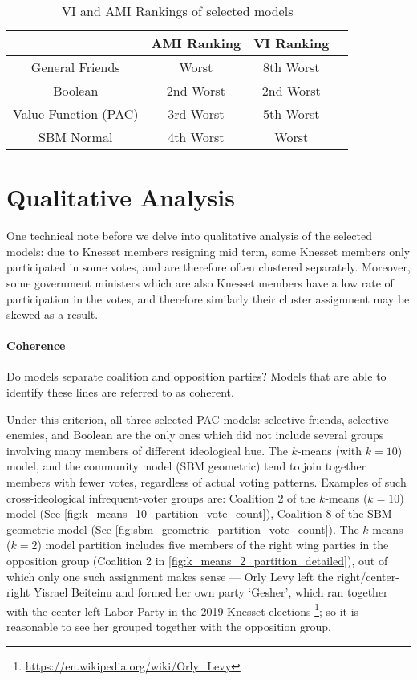 \begin{table}[ht]
\centering
\begin{tabular}{|c|c|c|c|}
\hline
       & AMI Ranking & VI Ranking \\ \hline
General Friends & Worst & 8th Worst \\
Boolean & 2nd Worst & 2nd Worst \\
Value Function (PAC) & 3rd Worst & 5th Worst \\
SBM Normal & 4th Worst & Worst \\
\hline
\end{tabular}
\caption{VI and AMI Rankings of selected models}
\label{Analysis:table:ami_vi_worst_rankings}
\end{table}


\section{Qualitative Analysis}
\label{sec:qualitative_analysis}

One technical note before we delve into qualitative analysis of the selected
models: due to Knesset members resigning mid term, some Knesset members only participated in some votes, and are therefore often clustered separately.
Moreover, some government ministers which are also Knesset members have a low
rate of participation in the votes, and therefore similarly their cluster
assignment may be skewed as a result.

\paragraph{Coherence}
Do models separate coalition and opposition parties? Models that are able to identify these lines are referred to as coherent.

Under this criterion, all three selected PAC models: selective friends,
selective enemies, and Boolean are the only ones which did not include several
groups involving many members of different ideological hue.
The $k$-means (with $k=10$) model, and the community model (SBM geometric) tend to
join together members with fewer votes, regardless of actual voting patterns.
Examples of such cross-ideological infrequent-voter groups are: Coalition 2
of the $k$-means ($k=10$) model (See \autoref{fig:k_means_10_partition_vote_count}),
Coalition 8 of the SBM geometric model (See
\autoref{fig:sbm_geometric_partition_vote_count}).
The $k$-means ($k=2$) model partition includes five members of the right wing
parties in the opposition group (Coalition 2 in
\autoref{fig:k_means_2_partition_detailed}), out of which only one such
assignment makes sense --- Orly Levy left the right/center-right Yisrael
Beiteinu and formed her own party `Gesher', which ran together with the center
left Labor Party in the 2019 Knesset elections
\footnote{\url{https://en.wikipedia.org/wiki/Orly_Levy}}; so it is reasonable to
see her grouped together with the opposition group.

